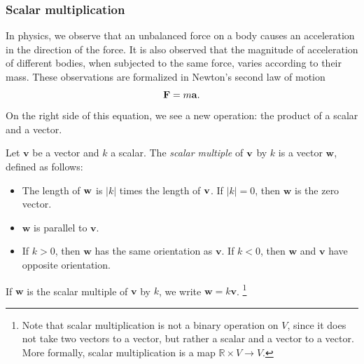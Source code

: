 \documentclass[12pt,letterpaper,reqno]{article}
\numberwithin{equation}{section}
\newcommand{\R}{\ensuremath{\mathbb R}}
\begin{document}
\subsubsection{Scalar multiplication}
In physics, we observe that an unbalanced force on a body causes an acceleration in the direction of the force. It is also observed that the magnitude of acceleration of different bodies, when subjected to the same force, varies according to their mass. These observations are formalized in Newton's second law of motion
\begin{equation}
	{\bf F}=m{\bf a}.
\end{equation}
On the right side of this equation, we see a new operation: the product of a scalar and a vector. 

\begin{defn}
Let $\mathbf{v}$ be a vector and $k$ a scalar. The \emph{scalar multiple} of ${\bf v}$ by $k$ is a vector $\mathbf{w}$, defined as follows:
\begin{itemize}
	\item The length of ${\bf w}$ is $|k|$ times the length of ${\bf v}$. If $|k|=0$, then $\mathbf{w}$ is the zero vector.
	\item $\mathbf{w}$ is parallel to $\mathbf{v}$.
	\item If $k>0$, then $\mathbf{w}$ has the same orientation as $\mathbf{v}$. If $k<0$, then $\mathbf{w}$ and $\mathbf{v}$ have opposite orientation.
\end{itemize}
If $\mathbf{w}$ is the scalar multiple of $\mathbf{v}$ by $k$, we write $\mathbf{w}=k\mathbf{v}$. \footnote{Note that scalar multiplication is not a binary operation on $V$, since it does not take two vectors to a vector, but rather a scalar and a vector to a vector. More formally, scalar multiplication is a map $\R \times V \to V$.}
\end{defn}
\end{document}
